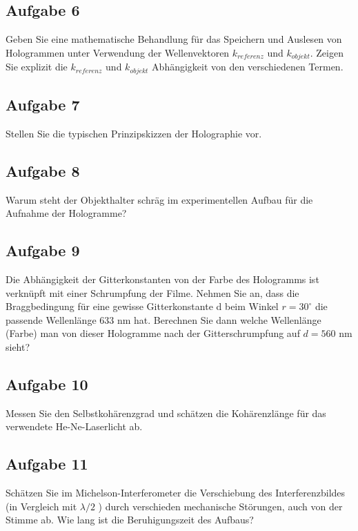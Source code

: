 \subsection*{Aufgabe 6}
Geben Sie eine mathematische Behandlung für das Speichern und Auslesen von Hologrammen unter Verwendung der Wellenvektoren $k_{referenz}$ 
und $k_{objekt}$. Zeigen Sie explizit die $k_{referenz}$ und $k_{objekt}$ Abhängigkeit von den verschiedenen Termen. 

\subsection*{Aufgabe 7}
Stellen Sie die typischen Prinzipskizzen der Holographie vor.

\subsection*{Aufgabe 8} 
Warum steht der Objekthalter schräg im experimentellen Aufbau für die Aufnahme der Hologramme? 

\subsection*{Aufgabe 9}
Die Abhängigkeit der Gitterkonstanten von der Farbe des Hologramms ist verknüpft mit einer Schrumpfung der Filme. Nehmen Sie an, dass die Braggbedingung für eine gewisse Gitterkonstante d beim Winkel $r = 30^{\circ}$ die passende Wellenlänge 633 nm hat. Berechnen Sie dann welche Wellenlänge (Farbe) man von dieser Hologramme nach der Gitterschrumpfung auf $d = 560$ nm sieht? 

\subsection*{Aufgabe 10}
Messen Sie den Selbstkohärenzgrad und schätzen die Kohärenzlänge für das verwendete He-Ne-Laserlicht ab. 

\subsection*{Aufgabe 11}
Schätzen Sie im Michelson-Interferometer die Verschiebung des Interferenzbildes (in Vergleich mit $\lambda/2$ ) durch verschieden mechanische Störungen, auch von der Stimme ab. Wie lang ist die Beruhigungszeit des Aufbaus?